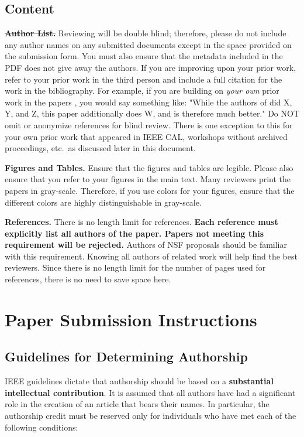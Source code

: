 \documentclass{sig-alternate}
\begin{document}
\subsection{Content}

\noindent\textbf{\sout{Author List.}} Reviewing will be double blind;
therefore, please do not include any author names on any submitted
documents except in the space provided on the submission form.  You must
also ensure that the metadata included in the PDF does not give away the
authors. If you are improving upon your prior work, refer to your prior
work in the third person and include a full citation for the work in the
bibliography.  For example, if you are building on {\em your own} prior
work in the papers \cite{nicepaper1,nicepaper2,nicepaper3}, you would say
something like: "While the authors of
\cite{nicepaper1,nicepaper2,nicepaper3} did X, Y, and Z, this paper
additionally does W, and is therefore much better."  Do NOT omit or
anonymize references for blind review.  There is one exception to this for
your own prior work that appeared in IEEE CAL, workshops without archived
proceedings, etc.\, as discussed later in this document.

\noindent\textbf{Figures and Tables.} Ensure that the figures and tables
are legible.  Please also ensure that you refer to your figures in the main
text.  Many reviewers print the papers in gray-scale. Therefore, if you use
colors for your figures, ensure that the different colors are highly
distinguishable in gray-scale.

\noindent\textbf{References.}  There is no length limit for references.
{\bf Each reference must explicitly list all authors of the paper. Papers
not meeting this requirement will be rejected.} Authors of NSF proposals
should be familiar with this requirement. Knowing all authors of related
work will help find the best reviewers. Since there is no length limit 
for the number of pages used for references, there is no need to save space 
here. 

\section{Paper Submission Instructions}

\subsection{Guidelines for Determining Authorship}

IEEE guidelines dictate that authorship should be based on a {\bf
substantial intellectual contribution}. It is assumed that all
authors have had a significant role in the creation of an article that
bears their names. In particular, the authorship credit must be
reserved only for individuals who have met each of the following
conditions:
\end{document}
